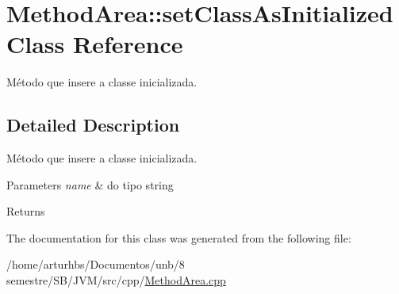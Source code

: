\hypertarget{classMethodArea_1_1setClassAsInitialized}{}\section{Method\+Area\+:\+:set\+Class\+As\+Initialized Class Reference}
\label{classMethodArea_1_1setClassAsInitialized}


Método que insere a classe inicializada.  




\subsection{Detailed Description}
Método que insere a classe inicializada. 


\begin{DoxyParams}{Parameters}
{\em name} & do tipo string \\
\hline
\end{DoxyParams}
\begin{DoxyReturn}{Returns}

\end{DoxyReturn}


The documentation for this class was generated from the following file\+:\begin{DoxyCompactItemize}
\item 
/home/arturhbs/\+Documentos/unb/8 semestre/\+S\+B/\+J\+V\+M/src/cpp/\hyperlink{MethodArea_8cpp}{Method\+Area.\+cpp}\end{DoxyCompactItemize}
